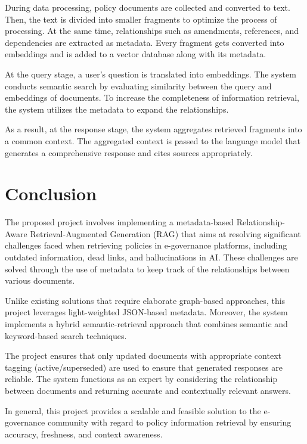 \documentclass[conference]{IEEEtran}
\begin{document}
During data processing, policy documents are collected and converted to text. Then, the text is divided into smaller fragments to optimize the process of processing. At the same time, relationships such as amendments, references, and dependencies are extracted as metadata. Every fragment gets converted into embeddings and is added to a vector database along with its metadata.

At the query stage, a user's question is translated into embeddings. The system conducts semantic search by evaluating similarity between the query and embeddings of documents. To increase the completeness of information retrieval, the system utilizes the metadata to expand the relationships.

As a result, at the response stage, the system aggregates retrieved fragments into a common context. The aggregated context is passed to the language model that generates a comprehensive response and cites sources appropriately.

\section{Conclusion}
The proposed project involves implementing a metadata-based Relationship-Aware Retrieval-Augmented Generation (RAG) that aims at resolving significant challenges faced when retrieving policies in e-governance platforms, including outdated information, dead links, and hallucinations in AI. These challenges are solved through the use of metadata to keep track of the relationships between various documents.

Unlike existing solutions that require elaborate graph-based approaches, this project leverages light-weighted JSON-based metadata. Moreover, the system implements a hybrid semantic-retrieval approach that combines semantic and keyword-based search techniques.

The project ensures that only updated documents with appropriate context tagging (active/superseded) are used to ensure that generated responses are reliable. The system functions as an expert by considering the relationship between documents and returning accurate and contextually relevant answers.

In general, this project provides a scalable and feasible solution to the e-governance community with regard to policy information retrieval by ensuring accuracy, freshness, and context awareness.
\end{document}
